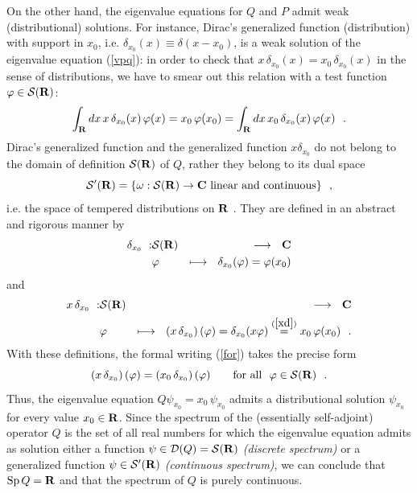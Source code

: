 \documentclass[a4wide,12pt]{report}
\begin{document}
On the other hand, the eigenvalue equations for $Q$ and $P$
admit weak (distributional) solutions. 
For instance, Dirac's generalized function (distribution) 
with support in $x_0$, i.e. 
$\delta_{x_0} (x) \equiv \delta (x-x_0)$,
is a weak solution of the eigenvalue equation (\ref{vpq}):
in order to check that 
$x \, \delta _{x_0} (x) = x_0 \, \delta_{x_0} (x)$
in the sense of 
distributions, we have to smear out this relation with a test function 
$\varphi \in {\cal S}({\bf R})$:
\begin{equation}
\label{for}
\int_{{\bf R}} dx \,
x \, \delta _{x_0} (x) \, \varphi (x) = x_0 \, \varphi (x_0) =
\int_{{\bf R}} dx \,
x_0 \, \delta _{x_0} (x) \, \varphi (x)
\ \ .
\end{equation}
Dirac's generalized function and the generalized function
$x \delta _{x_0}$ do not belong to the domain of definition 
${\cal S}({\bf R})$ of $Q$, rather they belong to its dual space 
\[
{\cal S}^{\prime} ({\bf R}) = \{ \omega : {\cal S}({\bf R}) \to {\bf C} \
\mbox{linear and continuous} \}
\ \ ,
\]
i.e. the space of tempered distributions on 
${\bf R}$ \cite{rs, sg, bgc, ls, gv}.
They are defined in an abstract and rigorous manner by  
\begin{eqnarray}
\label{xd}
\delta_{x_0} \ : & {\cal S}({\bf R})  & \longrightarrow \ \ {\bf C}
\\
 & \varphi & \longmapsto \ \
\delta_{x_0} (\varphi ) = \varphi (x_0)
\nonumber
\end{eqnarray}
and
\begin{eqnarray*}
x\, \delta_{x_0} \ : & {\cal S}({\bf R})  & \longrightarrow \ \ {\bf C}
\\
 & \varphi & \longmapsto \ \
\left( x\, \delta_{x_0} \right) (\varphi ) = \delta_{x_0} (x \varphi )
\stackrel{(\ref{xd})}{=}
x_0 \, \varphi (x_0)
\ \ .
\end{eqnarray*}
With these definitions, the formal writing (\ref{for})
takes the precise form 
\[
\left(
x \, \delta _{x_0} \right) (\varphi) = \left(
x_0 \, \delta _{x_0} \right) (\varphi)
\qquad \mbox{for all} \ \ \varphi \in {\cal S}({\bf R})
\ \ .
\]
Thus, the eigenvalue equation $Q \psi_{x_0} = x_0 \, \psi_{x_0}$
admits a distributional solution $\psi_{x_0}$ for every value 
$x_0 \in {\bf R}$.
Since the spectrum of the (essentially self-adjoint) operator 
$Q$ is the set of all real numbers for which the eigenvalue equation admits
as solution either a function $\psi \in {\cal D}(Q) = {\cal S}({\bf R})$ 
{\em (discrete spectrum)} 
or a generalized function $\psi \in {\cal S}^{\prime} ({\bf R})$ 
{\em (continuous spectrum)}, 
we can conclude that ${\rm Sp} \, Q = {\bf R}$ and that 
the spectrum of $Q$ is purely continuous.
 
\end{document}
